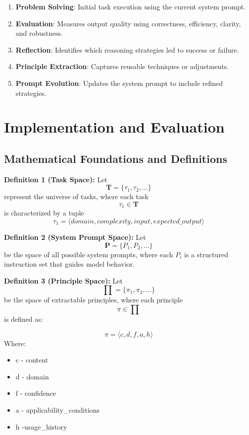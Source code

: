 \documentclass[10pt,a4paper,twocolumn]{article}
\begin{document}
\begin{enumerate}
    \item \textbf{Problem Solving}: Initial task execution using the current system prompt.
    \item \textbf{Evaluation}: Measures output quality using correctness, efficiency, clarity, and robustness.
    \item \textbf{Reflection}: Identifies which reasoning strategies led to success or failure.
    \item \textbf{Principle Extraction}: Captures reusable techniques or adjustments.
    \item \textbf{Prompt Evolution}: Updates the system prompt to include refined strategies.
\end{enumerate}





\section{{Implementation and Evaluation} }



\subsection{Mathematical Foundations and Definitions}

\textbf{Definition 1 (Task Space):} 
Let \[\textbf{T} = \{\tau_1, \tau_2, ...\}\] represent the universe of tasks, where each task \[\tau_1 \in \textbf{T}\] is characterized by a tuple \[\tau_1 = ⟨domain, complexity, input, expected\_output⟩\]


\textbf{Definition 2 (System Prompt Space):} 
Let \[\textbf{P} = \{P_1, P_2, ...\}\] be the space of all possible system prompts, where each $P_i$  is a structured instruction set that guides model behavior.


\textbf{Definition 3 (Principle Space):} 
Let \[\prod = \{\pi_1, \pi_2, ... \} \] be the space of extractable principles, where each principle \[\pi \in \prod\] is defined as:

\[\pi = ⟨c, d, f, a, h⟩ \]
Where:

\begin{itemize}
    \item c - content
    \item d - domain
    \item f - confidence
    \item a - applicability\_conditions
    \item h -usage\_history
\end{itemize}
\end{document}
